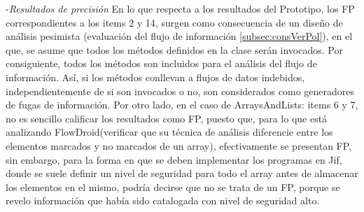 -\textit{Resultados de precisión}\newline
En lo que respecta a los resultados del Prototipo, los FP correspondientes a los
items 2 y 14, surgen como consecuencia de un diseño de análisis
pesimista (evaluación del flujo de información \ref{subsec:consVerPol}), en el
que, se asume que todos los métodos definidos en la clase serán invocados. Por
consiguiente, todos los métodos son incluidos para el análisis del flujo de
información. Así, si los métodos conllevan a flujos de datos indebidos,
independientemente de si son invocados o no, son considerados como generadores
de fugas de información.\newline 
Por otro lado, en el caso de ArraysAndLists: items 6 y 7, no es sencillo
calificar los resultados como FP, puesto que, para lo que está analizando
FlowDroid(verificar que su técnica de análisis diferencie entre los elementos
marcados y no marcados de un array), efectivamente se presentan FP, sin embargo,
para la forma en que se deben implementar los programas en Jif, donde se suele
definir un nivel de seguridad para todo el array antes de almacenar los
elementos en el mismo, podría decirse que no se trata de un FP, porque se revelo
información que había sido catalogada con nivel de seguridad alto.

